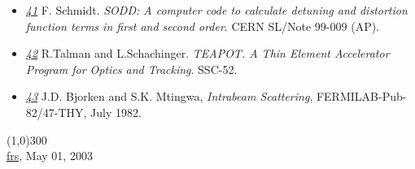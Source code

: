 \begin{itemize}
	\item \href{SODD}{\textit{41}} F. Schmidt. \textit{SODD: A computer code to calculate detuning and distortion function terms in first and second order}. CERN SL/Note 99-009 (AP). 




	\item \href{TEAPOT}{\textit{42}} R.Talman and L.Schachinger. \textit{TEAPOT. A Thin Element Accelerator Program for Optics and Tracking}. SSC-52. 




	\item \href{bm1}{\textit{43}} J.D. Bjorken and S.K. Mtingwa,  \textit{Intrabeam Scattering},  FERMILAB-Pub-82/47-THY, July 1982.  
\end{itemize}

\line(1,0){300}
\\
\href{http://www.cern.ch/Frank.Schmidt/frs_sign.html}{frs}, May 01, 2003 %

